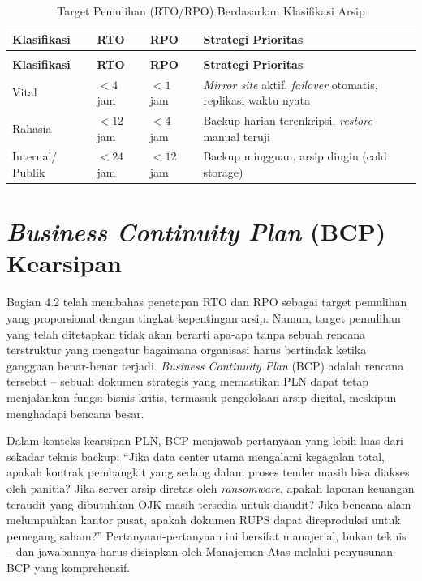 \documentclass[12pt,a4paper]{report}
\begin{document}
\begingroup
\small
\renewcommand{\arraystretch}{1.5}
\begin{xltabular}{\textwidth}{@{} >{\raggedright\arraybackslash}p{2.2cm} P{2.5cm} P{2.5cm} X @{}}
\caption{Target Pemulihan (RTO/RPO) Berdasarkan Klasifikasi Arsip}
\label{tab:rto-rpo}\\
\textbf{Klasifikasi} & \textbf{RTO} & \textbf{RPO} & \textbf{Strategi Prioritas} \\
\midrule
\endfirsthead

\\
\textbf{Klasifikasi} & \textbf{RTO} & \textbf{RPO} & \textbf{Strategi Prioritas} \\
\midrule
\endhead

\bottomrule
\endfoot

Vital & $< 4$ jam & $< 1$ jam & \textit{Mirror site} aktif, \textit{failover} otomatis, replikasi waktu nyata \\
Rahasia & $< 12$ jam & $< 4$ jam & Backup harian terenkripsi, \textit{restore} manual teruji \\
Internal/ Publik & $< 24$ jam & $< 12$ jam & Backup mingguan, arsip dingin (cold storage) \\
\end{xltabular}
\endgroup


\section{\textit{Business Continuity Plan} (BCP) Kearsipan}

\small Bagian 4.2 telah membahas penetapan RTO dan RPO sebagai target pemulihan yang proporsional dengan tingkat kepentingan arsip. Namun, target pemulihan yang telah ditetapkan tidak akan berarti apa-apa tanpa sebuah rencana terstruktur yang mengatur bagaimana organisasi harus bertindak ketika gangguan benar-benar terjadi. \textit{Business Continuity Plan} (BCP) adalah rencana tersebut -- sebuah dokumen strategis yang memastikan PLN dapat tetap menjalankan fungsi bisnis kritis, termasuk pengelolaan arsip digital, meskipun menghadapi bencana besar.

Dalam konteks kearsipan PLN, BCP menjawab pertanyaan yang lebih luas dari sekadar teknis backup: ``Jika data center utama mengalami kegagalan total, apakah kontrak pembangkit yang sedang dalam proses tender masih bisa diakses oleh panitia? Jika server arsip diretas oleh \textit{ransomware}, apakah laporan keuangan teraudit yang dibutuhkan OJK masih tersedia untuk diaudit? Jika bencana alam melumpuhkan kantor pusat, apakah dokumen RUPS dapat direproduksi untuk pemegang saham?'' Pertanyaan-pertanyaan ini bersifat manajerial, bukan teknis -- dan jawabannya harus disiapkan oleh Manajemen Atas melalui penyusunan BCP yang komprehensif.
\end{document}
